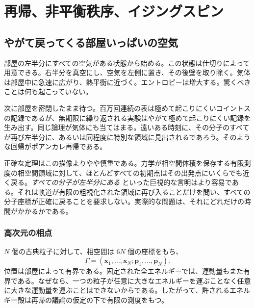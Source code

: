 \chapter{再帰、非平衡秩序、イジングスピン}


\section{やがて戻ってくる部屋いっぱいの空気}

部屋の左半分にすべての空気がある状態から始める。この状態は仕切りによって用意できる。右半分を真空にし、空気を左側に置き、その後壁を取り除く。気体は部屋中に急速に広がり、熱平衡に近づく。エントロピーは増大する。驚くべきことは何も起こっていない。

次に部屋を密閉したまま待つ。百万回連続の表は極めて起こりにくいコイントスの記録であるが、無期限に繰り返される実験はやがて極めて起こりにくい記録を生み出す。同じ論理が気体にも当てはまる。遠いある時刻に、その分子のすべてが再び左半分に、あるいは同程度に特別な領域に見出されるであろう。そのような回帰がポアンカレ再帰である。

正確な定理はこの描像よりやや慎重である。力学が相空間体積を保存する有限測度の相空間領域に対して、ほとんどすべての初期点はその出発点にいくらでも近く戻る。\emph{すべての分子が左半分にある} といった巨視的な言明はより容易である。それは軌道が有限の粗視化された領域に再び入ることだけを問い、すべての分子座標が正確に戻ることを要求しない。実際的な問題は、それにどれだけの時間がかかるかである。

\subsection{高次元の相点}

\(N\) 個の古典粒子に対して、相空間は \(6N\) 個の座標をもち、
\begin{equation}
 \Gamma=(\bm x_1,\ldots,\bm x_N;\bm p_1,\ldots,\bm p_N).
 \label{eq:sm8-phase-point}
\end{equation}
位置は部屋によって有界である。固定された全エネルギーでは、運動量もまた有界である。なぜなら、一つの粒子が任意に大きなエネルギーを運ぶことなく任意に大きな運動量を運ぶことはできないからである。したがって、許されるエネルギー殻は再帰の議論の仮定の下で有限の測度をもつ。

